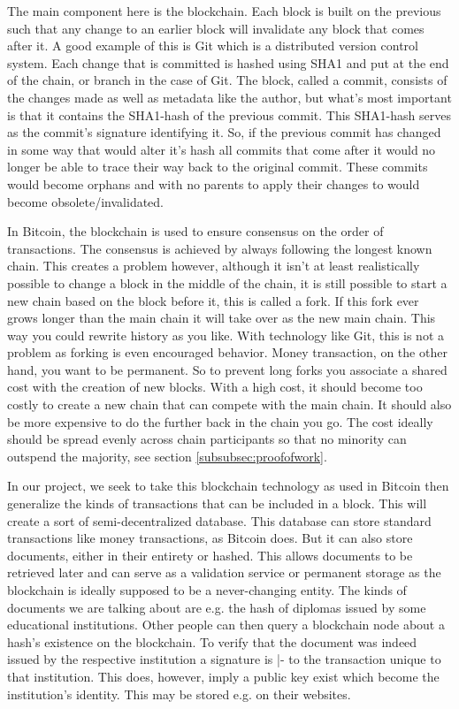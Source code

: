 \documentclass[12pt]{article}
\begin{document}
The main component here is the blockchain. Each block is built on the previous such that any change to an earlier block will invalidate any block that comes after it. A good example of this is Git which is a distributed version control system. Each change that is committed is hashed using SHA1 and put at the end of the chain, or branch in the case of Git. The block, called a commit, consists of the changes made as well as metadata like the author, but what's most important is that it contains the SHA1-hash of the previous commit. This SHA1-hash serves as the commit's signature identifying it. So, if the previous commit has changed in some way that would alter it's hash all commits that come after it would no longer be able to trace their way back to the original commit. These commits would become orphans and with no parents to apply their changes to would become obsolete/invalidated.


In Bitcoin, the blockchain is used to ensure consensus on the order of transactions. The consensus is achieved by always following the longest known chain. This creates a problem however, although it isn't at least realistically possible to change a block in the middle of the chain, it is still possible to start a new chain based on the block before it, this is called a fork. If this fork ever grows longer than the main chain it will take over as the new main chain. This way you could rewrite history as you like. With technology like Git, this is not a problem as forking is even encouraged behavior. Money transaction, on the other hand, you want to be permanent. So to prevent long forks you associate a shared cost with the creation of new blocks. With a high cost, it should become too costly to create a new chain that can compete with the main chain. It should also be more expensive to do the further back in the chain you go. The cost ideally should be spread evenly across chain participants so that no minority can outspend the majority, see section \ref{subsubsec:proofofwork}.
 
In our project, we seek to take this blockchain technology as used in Bitcoin then generalize the kinds of transactions that can be included in a block. This will create a sort of semi-decentralized database. This database can store standard transactions like money transactions, as Bitcoin does. But it can also store documents, either in their entirety or hashed. This allows documents to be retrieved later and can serve as a validation service or permanent storage as the blockchain is ideally supposed to be a never-changing entity. The kinds of documents we are talking about are e.g. the hash of diplomas issued by some educational institutions. Other people can then query a blockchain node about a hash's existence on the blockchain. To verify that the document was indeed issued by the respective institution a signature is |- to the transaction unique to that institution. This does, however, imply a public key exist which become the institution's identity. This may be stored e.g. on their websites.
\end{document}
